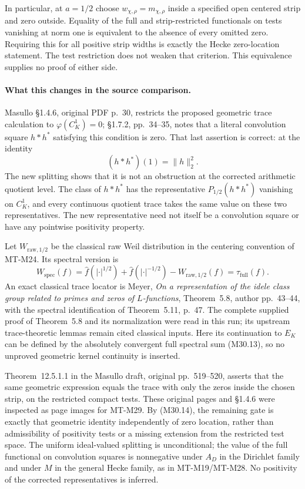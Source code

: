 In particular, at \(a=1/2\)
choose \(w_{\chi,\rho}=m_{\chi,\rho}\)
inside a specified open
centered strip and zero outside.
Equality of the full and
strip-restricted functionals
on tests vanishing at norm
one is equivalent to the
absence of every omitted
zero. Requiring this for
all positive strip widths
is exactly the Hecke
zero-location statement.
The test restriction does
not weaken that criterion.
This equivalence supplies
no proof of either side.

\paragraph{What this changes in the source comparison.}
Masullo \S1.4.6, original PDF p.~30,
restricts the proposed geometric
trace calculation to
\(\varphi(C_K^1)=0\);
\S1.7.2, pp.~34--35,
notes that a literal convolution
square \(h*h^*\) satisfying
this condition is zero.
That last assertion is correct:
at the identity
\[
                     (h*h^*)(1)=\|h\|_2^2.
 \]
The new splitting shows that
it is not an obstruction
at the corrected arithmetic
quotient level. The class
of \(h*h^*\) has the
representative \(P_{1/2}(h*h^*)\)
vanishing on \(C_K^1\), and
every continuous quotient
trace takes the same value
on these two representatives.
The new representative need
not itself be a convolution
square or have any pointwise
positivity property.

Let \(W_{\mathrm{raw},1/2}\)
be the classical raw Weil
distribution in the centering
convention of MT-M24. Its
spectral version is
\[
 W_{\mathrm{spec}}(f)
   =\widehat f(|\cdot|^{1/2})
      +\widehat f(|\cdot|^{-1/2})
      -W_{\mathrm{raw},1/2}(f)
   =\tau_{\mathrm{full}}(f).
\]
An exact classical trace
locator is Meyer,
\emph{On a representation of
the idele class group related
to primes and zeros of
\(L\)-functions},
Theorem~5.8, author pp.~43--44,
with the spectral identification
of Theorem~5.11, p.~47.
The complete supplied proof
of Theorem~5.8 and its
normalization were read in
this run; its upstream
trace-theoretic lemmas
remain cited classical inputs.
Here its continuation to
\(E_K\) can be defined by
the absolutely convergent
full spectral sum (M30.13),
so no unproved geometric
kernel continuity is inserted.

Theorem~12.5.1.1 in the
Masullo draft, original
pp.~519--520, asserts that
the same geometric expression
equals the trace with only
the zeros inside the chosen
strip, on the restricted
compact tests. These original
pages and \S1.4.6 were
inspected as page images
for MT-M29. By (M30.14),
the remaining gate is
exactly that geometric
identity independently
of zero location, rather
than admissibility of
positivity tests or a
missing extension from
the restricted test space.
The uniform ideal-valued
splitting is unconditional;
the value of the full
functional on convolution
squares is nonnegative
under \(A_D\) in the
Dirichlet family and
under \(M\) in the
general Hecke family,
as in MT-M19/MT-M28.
No positivity of the
corrected representatives
is inferred.

